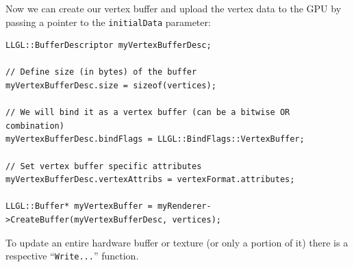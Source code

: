 \documentclass{article}
\begin{document}
Now we can create our vertex buffer and upload the vertex data to the GPU by passing a pointer
to the \texttt{initialData} parameter:
\begin{lstlisting}
LLGL::BufferDescriptor myVertexBufferDesc;

// Define size (in bytes) of the buffer
myVertexBufferDesc.size = sizeof(vertices);

// We will bind it as a vertex buffer (can be a bitwise OR combination)
myVertexBufferDesc.bindFlags = LLGL::BindFlags::VertexBuffer;

// Set vertex buffer specific attributes
myVertexBufferDesc.vertexAttribs = vertexFormat.attributes;

LLGL::Buffer* myVertexBuffer = myRenderer->CreateBuffer(myVertexBufferDesc, vertices);
\end{lstlisting}
To update an entire hardware buffer or texture (or only a portion of it) there is a respective
``\texttt{Write...}'' function.
\end{document}
